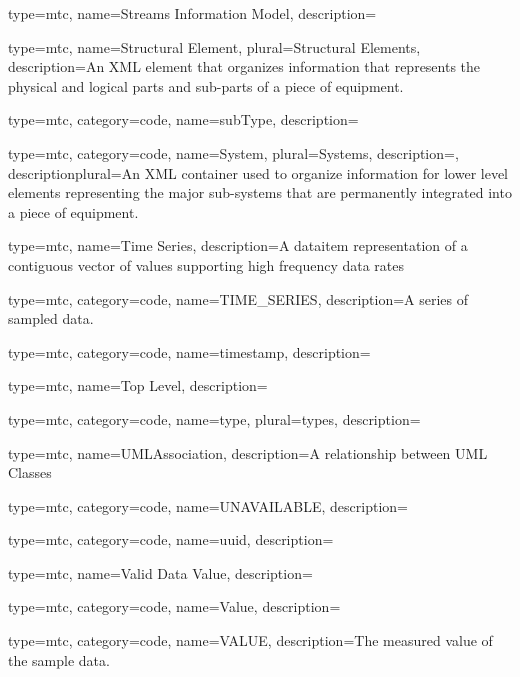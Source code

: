 {
  type=mtc,
  name={Streams Information Model},
  description={}
}

{
  type=mtc,
  name={Structural Element},
  plural={Structural Elements},
  description={An XML element that organizes information that represents the physical and logical parts and sub-parts of a piece of equipment.}
}

{
  type=mtc,
  category=code,
  name={subType},
  description={}
}

{
  type=mtc,
  category=code,
  name={System},
  plural={Systems},
  description={},
  descriptionplural={An XML container used to organize information for \gls{lower level} elements representing the major sub-systems that are permanently integrated into a piece of equipment.}
}

{
  type=mtc,
  name={Time Series},
  description={A \gls{dataitem} representation of a contiguous vector of values supporting high frequency data rates}
}

{
  type=mtc,
  category=code,
  name={TIME\_SERIES},
  description={A series of sampled data. }
}

{
  type=mtc,
  category=code,
  name={timestamp},
  description={}
}

{
  type=mtc,
  name={Top Level},
  description={}
}

{
  type=mtc,
  category=code,
  name={type},
  plural={types},
  description={}
}


{
  type=mtc,
  name=UMLAssociation,
  description={A relationship between UML Classes}
}

{
  type=mtc,
  category=code,
  name={UNAVAILABLE},
  description={}
}

{
  type=mtc,
  category=code,
  name={uuid},
  description={}
}

{
  type=mtc,
  name={Valid Data Value},
  description={}
}

{
  type=mtc,
  category=code,
  name={Value},
  description={}
}

{
  type=mtc,
  category=code,
  name={VALUE},
  description={The measured value of the sample data.}
}


